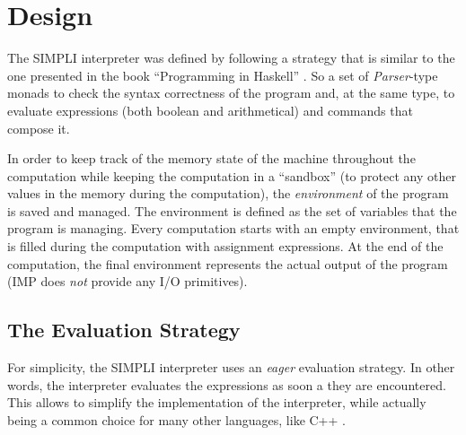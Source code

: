 \documentclass{esposito-documentation}
\begin{document}
\chapter{Design}

The SIMPLI interpreter was defined by following a strategy that is similar to
the one presented in the book ``Programming in Haskell'' \cite{Hutton2017}. So
a set of \emph{Parser}-type monads to check the syntax correctness of the
program and, at the same type, to evaluate expressions (both boolean and
arithmetical) and commands that compose it.

In order to keep track of the memory state of the machine throughout the
computation while keeping the computation in a ``sandbox'' (to protect any
other values in the memory during the computation), the \emph{environment} of
the program is saved and managed. The environment is defined as the set of
variables that the program is managing. Every computation starts with an empty
environment, that is filled during the computation with assignment expressions.
At the end of the computation, the final environment represents the actual
output of the program (IMP does \emph{not} provide any I/O primitives).

\section{The Evaluation Strategy}

For simplicity, the SIMPLI interpreter uses an \emph{eager} evaluation
strategy. In other words, the interpreter evaluates the expressions as soon a
they are encountered. This allows to simplify the implementation of the
interpreter, while actually being a common choice for many other languages,
like C++ \cite{Stroustrup2013}.
\end{document}
